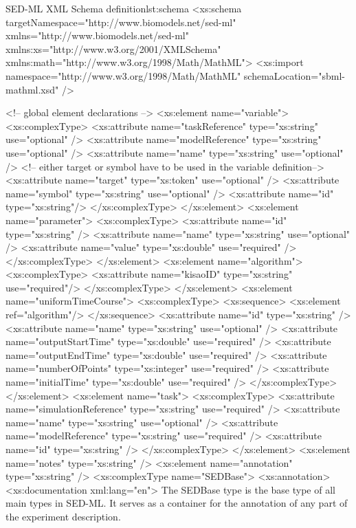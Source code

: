 \footnotesize
\begin{myXmlLst}{SED-ML XML Schema definition}{lst:schema}
<xs:schema targetNamespace="http://www.biomodels.net/sed-ml" xmlns="http://www.biomodels.net/sed-ml"
	xmlns:xs="http://www.w3.org/2001/XMLSchema" xmlns:math="http://www.w3.org/1998/Math/MathML">
	<xs:import namespace="http://www.w3.org/1998/Math/MathML"
		schemaLocation="sbml-mathml.xsd" />
		
<!-- global element declarations -->
	<xs:element name="variable">
		<xs:complexType>
			<xs:attribute name="taskReference" type="xs:string" use="optional" />
			<xs:attribute name="modelReference" type="xs:string" use="optional" />
			<xs:attribute name="name" type="xs:string" use="optional" />
			<!-- either target or symbol have to be used  in the variable definition-->
			<xs:attribute name="target" type="xs:token" use="optional" />
			<xs:attribute name="symbol" type="xs:string" use="optional" />
			<xs:attribute name="id" type="xs:string"/>
		</xs:complexType>
	</xs:element>
	<xs:element name="parameter">
		<xs:complexType>
		 	<xs:attribute name="id" type="xs:string" />
			<xs:attribute name="name" type="xs:string" use="optional" />
			<xs:attribute name="value" type="xs:double" use="required" />
		</xs:complexType>
	</xs:element>
	<xs:element name="algorithm">
		<xs:complexType>
			<xs:attribute name="kisaoID" type="xs:string" use="required"/>
		</xs:complexType>
	</xs:element>
	<xs:element name="uniformTimeCourse">
		<xs:complexType>
			<xs:sequence>
				<xs:element ref="algorithm"/>
			</xs:sequence>
			<xs:attribute name="id" type="xs:string" />
			<xs:attribute name="name" type="xs:string" use="optional" />
			<xs:attribute name="outputStartTime" type="xs:double"
				use="required" />
			<xs:attribute name="outputEndTime" type="xs:double" use="required" />
			<xs:attribute name="numberOfPoints" type="xs:integer"
				use="required" />
			<xs:attribute name="initialTime" type="xs:double" use="required" />
		</xs:complexType>
	</xs:element>
	<xs:element name="task">
		<xs:complexType>
			<xs:attribute name="simulationReference" type="xs:string"
				use="required" />
			<xs:attribute name="name" type="xs:string" use="optional" />
			<xs:attribute name="modelReference" type="xs:string"
				use="required" />
			<xs:attribute name="id" type="xs:string" />
		</xs:complexType>
	</xs:element>
	<xs:element name="notes" type="xs:string" />
	<xs:element name="annotation" type="xs:string" />
	<xs:complexType name="SEDBase">
		<xs:annotation>
			<xs:documentation xml:lang="en">
			The SEDBase type is the base type of all main types in SED-ML. It serves as a container for the annotation of any part of the experiment description.

\end{myXmlLst}
